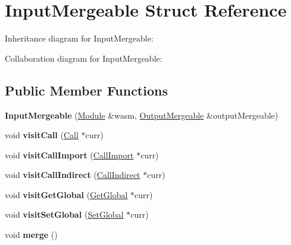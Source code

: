 \hypertarget{struct_input_mergeable}{}\section{Input\+Mergeable Struct Reference}
\label{struct_input_mergeable}


Inheritance diagram for Input\+Mergeable\+:


Collaboration diagram for Input\+Mergeable\+:
\subsection*{Public Member Functions}
\begin{DoxyCompactItemize}
\item 
\mbox{\label{struct_input_mergeable_acfde734484cc1ac28a5ce3854f8e82e4}} 
{\bfseries Input\+Mergeable} (\mbox{\hyperlink{classwasm_1_1_module}{Module}} \&wasm, \mbox{\hyperlink{struct_output_mergeable}{Output\+Mergeable}} \&output\+Mergeable)
\item 
\mbox{\label{struct_input_mergeable_a17bb354003265348921c3fbb4f352613}} 
void {\bfseries visit\+Call} (\mbox{\hyperlink{classwasm_1_1_call}{Call}} $\ast$curr)
\item 
\mbox{\label{struct_input_mergeable_ac12fb2b89c82c11d7b9b9f954af78834}} 
void {\bfseries visit\+Call\+Import} (\mbox{\hyperlink{classwasm_1_1_call_import}{Call\+Import}} $\ast$curr)
\item 
\mbox{\label{struct_input_mergeable_aa25bac7b7eea57530989b74d8c63ec7f}} 
void {\bfseries visit\+Call\+Indirect} (\mbox{\hyperlink{classwasm_1_1_call_indirect}{Call\+Indirect}} $\ast$curr)
\item 
\mbox{\label{struct_input_mergeable_a8f96363f1782bb180702550d26853c92}} 
void {\bfseries visit\+Get\+Global} (\mbox{\hyperlink{classwasm_1_1_get_global}{Get\+Global}} $\ast$curr)
\item 
\mbox{\label{struct_input_mergeable_a88d175f781034985cf849efcc7ec02e0}} 
void {\bfseries visit\+Set\+Global} (\mbox{\hyperlink{classwasm_1_1_set_global}{Set\+Global}} $\ast$curr)
\item 
\mbox{\label{struct_input_mergeable_ace2b15ef91b0784e9d7458ceb645bc06}} 
void {\bfseries merge} ()
\end{DoxyCompactItemize}
